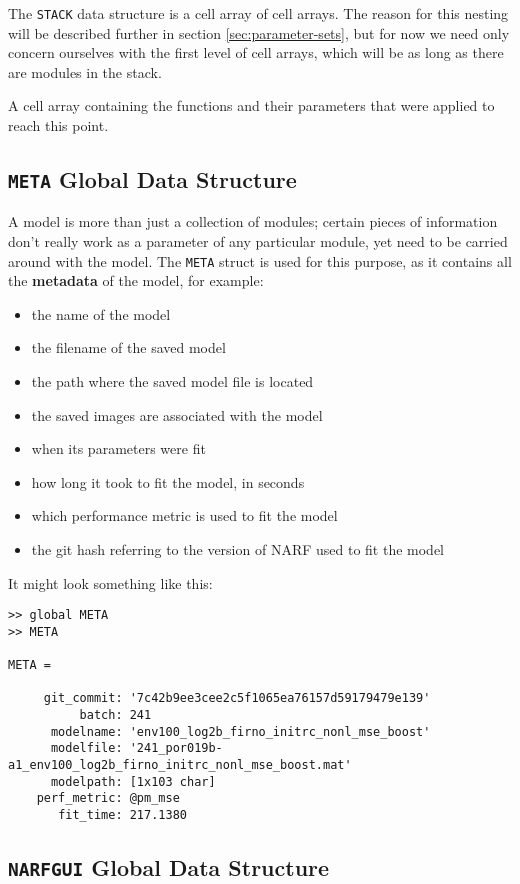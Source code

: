 \documentclass[letterpaper]{report}
\newcommand{\definition}[1]{\textbf{#1}}
\newcommand{\matlab}[1]{\texttt{#1}}
\begin{document}
The \matlab{STACK} data structure is a cell array of cell arrays. The reason for this nesting will be described further in section \ref{sec:parameter-sets}, but for now we need only concern ourselves with the first level of cell arrays, which will be as long as there are modules in the stack. 

A cell array containing the functions and their parameters that were applied to reach this point. 

\subsection{\matlab{META} Global Data Structure}

A model is more than just a collection of modules; certain pieces of information don't really work as a parameter of any particular module, yet need to be carried around with the model. The \matlab{META} struct is used for this purpose, as it contains all the \definition{metadata} of the model, for example:

\begin{itemize}
  \item the name of the model
  \item the filename of the saved model
  \item the path where the saved model file is located
  \item the saved images are associated with the model
  \item when its parameters were fit
  \item how long it took to fit the model, in seconds
  \item which performance metric is used to fit the model
  \item the git hash referring to the version of NARF used to fit the model
\end{itemize}

It might look something like this:

\begin{verbatim}
>> global META
>> META

META = 

     git_commit: '7c42b9ee3cee2c5f1065ea76157d59179479e139'
          batch: 241
      modelname: 'env100_log2b_firno_initrc_nonl_mse_boost'
      modelfile: '241_por019b-a1_env100_log2b_firno_initrc_nonl_mse_boost.mat'
      modelpath: [1x103 char]
    perf_metric: @pm_mse
       fit_time: 217.1380
\end{verbatim}

\subsection{\matlab{NARFGUI} Global Data Structure}
\end{document}
